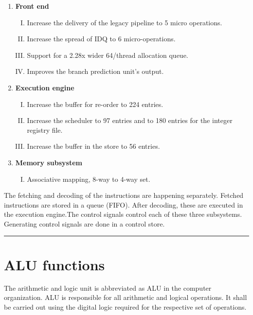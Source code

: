 \documentclass[a4paper,11pt]{article}
\begin{document}
 \begin{enumerate}[\hspace{1cm}1.]
 	\item \textbf{	Front end}
 	\begin{enumerate}[I.]
 		\item  	 Increase the delivery of the legacy pipeline to 5 micro operations.
 		\item Increase the spread of IDQ to 6 micro-operations.
 		\item Support for a 2.28x wider 64/thread allocation queue.
 		\item Improves the branch prediction unit's output.

 	\end{enumerate}

 	\item\textbf{	Execution engine}
 	\begin{enumerate}[I.]
 		\item  	 Increase the buffer for re-order to 224 entries.
 		\item Increase the scheduler to 97 entries and to 180 entries for the integer registry file.
 		\item Increase the buffer in the store to 56 entries.
 	\end{enumerate}

 	\item	\textbf{Memory subsystem}
 	\begin{enumerate}[I.]
 		\item Associative mapping, 8-way to 4-way set.
 	\end{enumerate}
 \end{enumerate}
The fetching and decoding of the instructions are happening separately. Fetched instructions are stored in a queue (FIFO). After decoding, these are executed in the execution engine.The control signals control each of these three subsystems. Generating control signals are done in a control store\cite{Coffee}.
\vspace{1cm}\hrule
\section{ALU functions}

The arithmetic and logic unit is abbreviated as ALU in the computer organization. ALU is responsible for all arithmetic and logical operations. It shall be carried out using the digital logic required for the respective set of operations.
\end{document}

